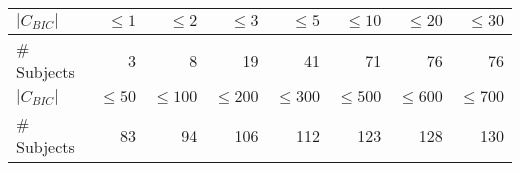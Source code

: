 \begin{tabular}{l|rrrrrrr}
\toprule
$|C_{BIC}|$ &   $\leq 1$ &   $\leq 2$ &   $\leq 3$ &   $\leq 5$ &  $\leq 10$ &  $\leq 20$ &  $\leq 30$\\\midrule
\# Subjects &          3 &          8 &         19 &         41 &         71 &         76 &         76\\\midrule
$|C_{BIC}|$ &  $\leq 50$ & $\leq 100$ & $\leq 200$ & $\leq 300$ & $\leq 500$ & $\leq 600$ & $\leq 700$\\\midrule
\# Subjects &         83 &         94 &        106 &        112 &        123 &        128 &        130\\\bottomrule
\end{tabular}